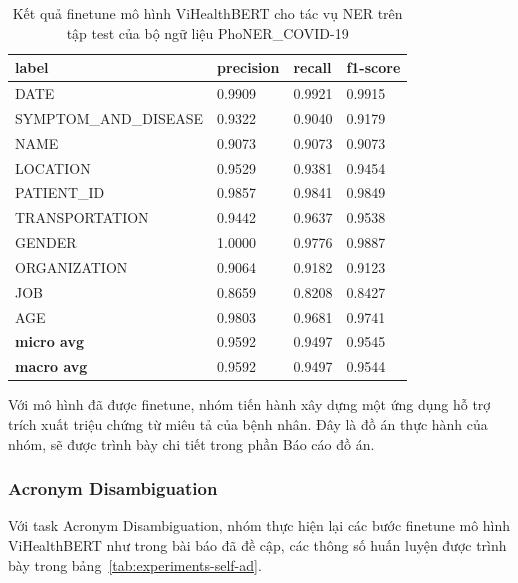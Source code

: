 \begin{table}
\centering
\begin{tabular}{|l|l|l|l|}
\hline
\textbf{label}        & \textbf{precision} & \textbf{recall} & \textbf{f1-score} \\ \hline
DATE                  & 0.9909             & 0.9921          & 0.9915            \\ \hdashline
SYMPTOM\_AND\_DISEASE & 0.9322             & 0.9040          & 0.9179            \\ \hdashline
NAME                  & 0.9073             & 0.9073          & 0.9073            \\ \hdashline
LOCATION              & 0.9529             & 0.9381          & 0.9454            \\ \hdashline
PATIENT\_ID           & 0.9857             & 0.9841          & 0.9849            \\ \hdashline
TRANSPORTATION        & 0.9442             & 0.9637          & 0.9538            \\ \hdashline
GENDER                & 1.0000             & 0.9776          & 0.9887            \\ \hdashline
ORGANIZATION          & 0.9064             & 0.9182          & 0.9123            \\ \hdashline
JOB                   & 0.8659             & 0.8208          & 0.8427            \\ \hdashline
AGE                   & 0.9803             & 0.9681          & 0.9741            \\ \hline
\textbf{micro avg}    & 0.9592             & 0.9497          & 0.9545            \\ \hline
\textbf{macro avg}    & 0.9592             & 0.9497          & 0.9544            \\ \hline
\end{tabular}
\caption{Kết quả finetune mô hình ViHealthBERT cho tác vụ NER trên tập test của bộ ngữ liệu PhoNER\_COVID-19}
\label{tab:expreiments-self-ner-results}
\end{table}
Với mô hình đã được finetune, nhóm tiến hành xây dựng một ứng dụng hỗ trợ trích xuất triệu chứng từ miêu tả của bệnh nhân. Đây là đồ án thực hành của nhóm, sẽ được trình bày chi tiết trong phần Báo cáo đồ án.

\subsubsection{Acronym Disambiguation}
Với task Acronym Disambiguation, nhóm thực hiện lại các bước finetune mô hình ViHealthBERT như trong bài báo đã đề cập, các thông số huấn luyện được trình bày trong bảng~\ref{tab:experiments-self-ad}.

